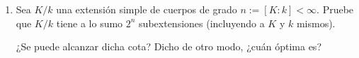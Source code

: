 \documentclass[11pt, reqno]{amsart}
\begin{document}
\begin{enumerate}
	\item\label{exr:simple_subextension_count}\lookright
		Sea $K/k$ una extensión simple de cuerpos de grado $n := [K:k] < \infty$.
		Pruebe que $K/k$ tiene a lo sumo $2^n$ subextensiones (incluyendo a $K$ y $k$ mismos).

		\begin{prob}
			¿Se puede alcanzar dicha cota? Dicho de otro modo, ¿cuán óptima es?
		\end{prob}

\end{enumerate}

\appendix
\end{document}
